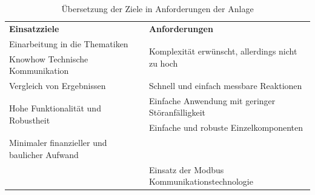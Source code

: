 \begin{table}[H]
\centering
\small
\renewcommand{\arraystretch}{1.3}
\begin{tabularx}{1\textwidth}{m{}m{}}

\toprule

\textbf{Einsatzziele} & \textbf{Anforderungen} \\

\cmidrule[0.5pt](r{0.25em}){1-1} 
\cmidrule[0.5pt](l{0.25em}){2-2}

Einarbeitung in die Thematiken	& \multirow{2}{\hsize}{Komplexität erwünscht, allerdings nicht zu hoch}  \\

\cmidrule[0.1pt](lr{2em}){1-1} 

Knowhow Technische Kommunikation							&					\\

\cmidrule[0.5pt](r{0.25em}){1-1} 
\cmidrule[0.5pt](l{0.25em}){2-2}

Vergleich von Ergebnissen		& Schnell und einfach messbare Reaktionen      \\
\cmidrule[0.5pt](r{0.25em}){1-1} 
\cmidrule[0.5pt](l{0.25em}){2-2}

\multirow{2}{\hsize}{Hohe Funktionalität und Robustheit} & Einfache Anwendung mit geringer Störanfälligkeit\\
\cmidrule[0.1pt](lr{2em}){2-2} 

 & Einfache und robuste Einzelkomponenten \\
 
\cmidrule[0.5pt](r{0.25em}){1-1} 
\cmidrule[0.5pt](l{0.25em}){2-2}

Minimaler finanzieller und baulicher Aufwand & \\

\cmidrule[0.5pt](r{0.25em}){1-1} 
\cmidrule[0.5pt](l{0.25em}){2-2}

& Einsatz der Modbus Kommunikationstechnologie \\

\bottomrule
\end{tabularx}
\caption{Übersetzung der Ziele in Anforderungen der Anlage}
\label{tab:anforderungen_umgebung}
\end{table}



